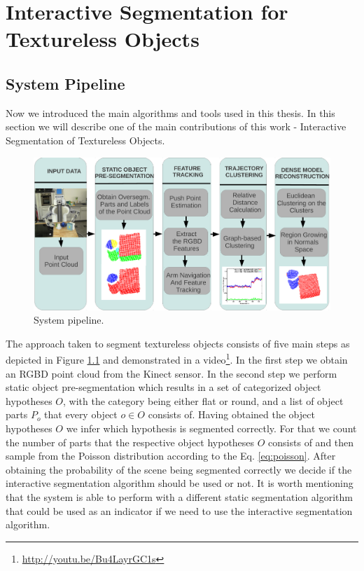 \chapter{Interactive Segmentation for Textureless Objects}
\label{chapter:Textureless Segmentation}


\section{System Pipeline}



 Now we introduced the main algorithms and tools used in this thesis. In this section we will describe one of the main contributions of this work - Interactive Segmentation of Textureless Objects.
 
\begin{figure}[h!]
\centering
  \includegraphics[width=\columnwidth]{figures/segmentation_pipeline.pdf}
  \caption{System pipeline.}
  \label{fig:pipeline}
\end{figure} 
 
 The approach taken to segment textureless objects   
 consists of five main steps as depicted in Figure \ref{fig:pipeline}
  and demonstrated in a video\footnote{\url{http://youtu.be/Bu4LayrGC1s}}.
 In the first step we obtain an RGBD point cloud from the Kinect sensor. In the second step we perform static object
 pre-segmentation which results in a set of categorized object hypotheses $O$,
 with the category being either flat or round, and a list of object parts $P_{o}$ that every object 
 $o \in O$ consists of. Having obtained the object hypotheses $O$ we infer which hypothesis
 is segmented  correctly. For
 that we count the  number of parts that the respective object hypotheses $O$ 
 consists of and then sample from the Poisson distribution according to the Eq. \ref{eq:poisson}.
 After obtaining the probability of the scene being segmented correctly we 
decide if the interactive segmentation algorithm should be used or not. It is worth mentioning that the system is able to perform with a different static segmentation algorithm that could be used as an indicator if we need to use the interactive segmentation algorithm.





